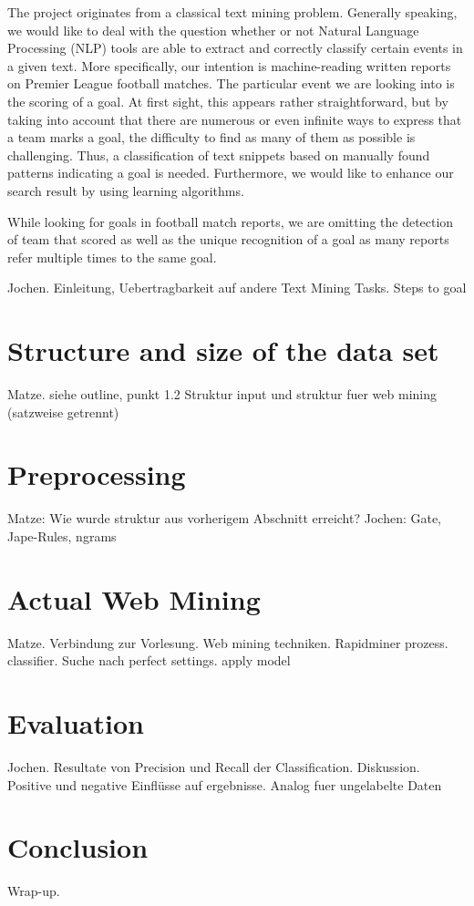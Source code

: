 \documentclass[11pt,titlepage,oneside,openany]{book}
\begin{document}
The project originates from a classical text mining problem. Generally speaking, we would like to deal with the question whether or not Natural Language Processing (NLP) tools are able to extract and correctly classify certain events in a given text. More specifically, our intention is machine-reading written reports on Premier League football matches. The particular event we are looking into is the scoring of a goal. At first sight, this appears rather straightforward, but by taking into account that there are numerous or even infinite ways to express that a team marks a goal, the difficulty to find as many of them as possible is challenging. Thus, a classification of text snippets based on manually found patterns indicating a goal is needed. Furthermore, we would like to enhance our search result by using learning algorithms.  

While looking for goals in football match reports, we are omitting the detection of team that scored as well as the unique recognition of a goal as many reports refer multiple times to the same goal.



Jochen. Einleitung, Uebertragbarkeit auf andere Text Mining Tasks. Steps to goal

\section{Structure and size of the data set}
Matze. siehe outline, punkt 1.2 Struktur input und struktur fuer web mining (satzweise getrennt)

\section{Preprocessing}
Matze: Wie wurde struktur aus vorherigem Abschnitt erreicht? 
Jochen: Gate, Jape-Rules, ngrams

\section{Actual Web Mining}
Matze. Verbindung zur Vorlesung. Web mining techniken. Rapidminer prozess. classifier. Suche nach perfect settings. apply model 

\section{Evaluation}
Jochen. Resultate von Precision und Recall der Classification. Diskussion. Positive und negative Einflüsse auf ergebnisse. Analog fuer ungelabelte Daten 
\section{Conclusion}
Wrap-up.



\end{document}
